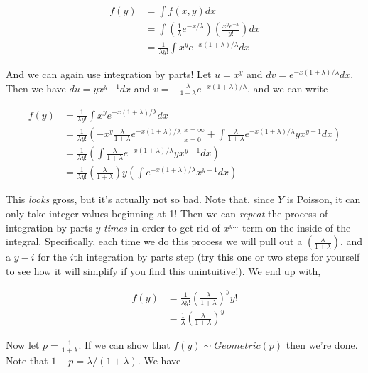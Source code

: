 \documentclass[
  letterpaper,
  DIV=11,
  numbers=noendperiod]{scrreprt}
\begin{document}
\begin{align*}
    f(y) & = \int f(x, y) dx \\
    & = \int \left( \frac{1}{\lambda} e^{-x/\lambda} \right) \left( \frac{x^y e^{-x}}{y!} \right) dx \\
    & = \frac{1}{\lambda y!} \int x^y e^{-x(1 + \lambda)/\lambda} dx
\end{align*}

And we can again use integration by parts! Let \(u = x^y\) and
\(dv = e^{-x(1 + \lambda)/\lambda} dx\). Then we have
\(du = yx^{y-1} dx\) and
\(v = -\frac{\lambda}{1 + \lambda}e^{-x(1 + \lambda)/\lambda}\), and we
can write

\begin{align*}
    f(y) & = \frac{1}{\lambda y!} \int x^y e^{-x(1 + \lambda)/\lambda} dx \\
    & = \frac{1}{\lambda y!} \left( -x^y \frac{\lambda}{1 + \lambda}e^{-x(1 + \lambda)/\lambda} \bigg|_{x = 0}^{x = \infty}  + \int \frac{\lambda}{1 + \lambda}e^{-x(1 + \lambda)/\lambda} yx^{y-1} dx\right) \\
    & = \frac{1}{\lambda y!} \left(  \int \frac{\lambda}{1 + \lambda}e^{-x(1 + \lambda)/\lambda} yx^{y-1} dx \right) \\
    & = \frac{1}{\lambda y!} \left( \frac{\lambda }{1 + \lambda} \right) y \left(  \int e^{-x(1 + \lambda)/\lambda} x^{y-1} dx \right)
\end{align*}

This \emph{looks} gross, but it's actually not so bad. Note that, since
\(Y\) is Poisson, it can only take integer values beginning at 1! Then
we can \emph{repeat} the process of integration by parts \(y\)
\emph{times} in order to get rid of \(x^{y\dots}\) term on the inside of
the integral. Specifically, each time we do this process we will pull
out a \(\left( \frac{\lambda }{1 + \lambda} \right)\), and a \(y - i\)
for the \(i\)th integration by parts step (try this one or two steps for
yourself to see how it will simplify if you find this unintuitive!). We
end up with,

\begin{align*}
    f(y) & = \frac{1}{\lambda y!} \left( \frac{\lambda }{1 + \lambda} \right)^y y! \\
    & = \frac{1}{\lambda} \left(\frac{\lambda}{1 + \lambda}\right)^y
\end{align*}

Now let \(p = \frac{1}{1 + \lambda}\). If we can show that
\(f(y) \sim Geometric(p)\) then we're done. Note that
\(1 - p = \lambda/(1 + \lambda)\). We have
\end{document}
